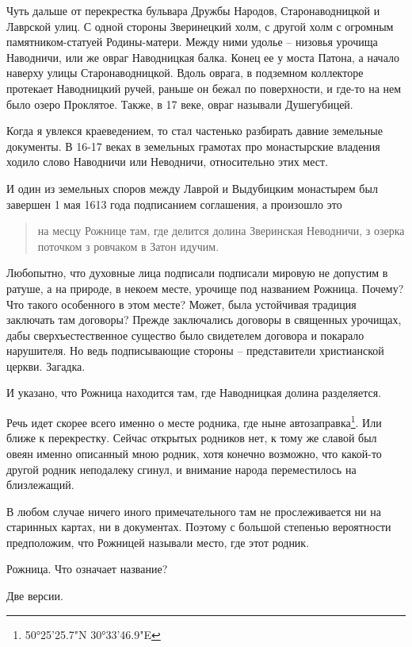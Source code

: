 \documentclass[a5paper,11pt,openany]{article}
\begin{document}
   Чуть дальше от перекрестка бульвара Дружбы Народов, Старонаводницкой и Лаврской улиц. С одной стороны Зверинецкий холм, с другой холм с огромным памятником-статуей Родины-матери.  Между ними удолье – низовья урочища Наводничи, или же овраг Наводницкая балка. Конец ее у моста Патона, а начало наверху  улицы Старонаводницкой. Вдоль оврага, в подземном коллекторе протекает Наводницкий ручей, раньше он бежал по поверхности, и где-то на нем было озеро Проклятое. Также, в 17 веке, овраг называли Душегубицей.

    Когда я увлекся краеведением, то стал частенько разбирать давние земельные документы. В 16-17 веках в земельных грамотах про монастырские владения ходило слово Наводничи или Неводничи, относительно этих мест.

   И один из земельных споров между Лаврой и Выдубицким монастырем был завершен 1 мая 1613 года подписанием соглашения, а произошло это

\begin{quotation}
\noindent на месцу Рожнице там, где делится долина Зверинская Неводничи, з озерка поточком з ровчаком в Затон идучим.
\end{quotation} 

   Любопытно, что духовные лица подписали    подписали мировую не допустим в ратуше, а на природе, в некоем месте, урочище под названием Рожница. Почему? Что такого особенного в этом месте? Может, была устойчивая традиция заключать там договоры? Прежде заключались договоры в священных урочищах, дабы сверхъестественное существо было свидетелем договора и покарало нарушителя. Но ведь подписывающие стороны – представители христианской церкви. Загадка.

   И указано, что Рожница находится там, где Наводницкая долина разделяется. 

   Речь идет скорее всего именно о месте родника, где ныне автозаправка\footnote{50°25'25.7"N 30°33'46.9"E}. Или ближе к перекрестку. Сейчас открытых родников нет, к тому же славой был овеян именно описанный мною родник, хотя конечно возможно, что какой-то другой родник неподалеку сгинул, и внимание народа переместилось на близлежащий.

   В любом случае ничего иного примечательного там не прослеживается ни на старинных картах, ни в документах. Поэтому с большой степенью вероятности предположим, что Рожницей называли место, где этот родник. 

   Рожница. Что означает название?

   Две версии. 
\end{document}
